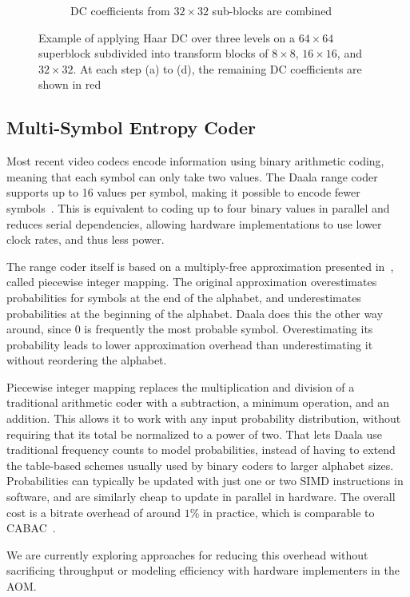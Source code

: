 \documentclass[english,conference,10pt]{IEEEtran}
\begin{document}
\begin{figure}
\begin{subfigure}[t]{0.49\columnwidth}
\caption{DC coefficients from $32\times 32$ sub-blocks are combined}
\end{subfigure}
\caption{Example of applying Haar DC over three levels on a $64\times 64$
superblock subdivided into transform blocks of $8 \times 8$, $16 \times 16$,
and $32 \times 32$. At each step (a) to (d), the remaining DC coefficients
are shown in red\label{fig:haardc}}

\end{figure}

\subsection{Multi-Symbol Entropy Coder}
\label{sec:EntropyCoder}

Most recent video codecs encode information using binary arithmetic
coding, meaning that each symbol can only take two values. The Daala
range coder supports up to 16 values per symbol, making it possible
to encode fewer symbols~\cite{derfTools}. This is equivalent to
coding up to four binary values in parallel and reduces serial dependencies,
allowing hardware implementations to use lower clock rates, and thus less
power.

The range coder itself is based on a multiply-free approximation presented
in~\cite{stuiver1998piecewise}, called piecewise integer mapping. The original
approximation overestimates probabilities for symbols at the end of the alphabet, and underestimates
probabilities at the beginning of the alphabet. Daala does this the
other way around, since $0$ is frequently the most probable symbol.
Overestimating its probability leads to lower approximation overhead than
underestimating it without reordering the alphabet.

Piecewise integer mapping replaces the multiplication and division of a traditional
arithmetic coder with a subtraction, a minimum operation, and an addition. This
allows it to work with any input probability distribution, without requiring
that its total be normalized to a power of two. That lets Daala use traditional
frequency counts to model probabilities, instead of having to extend the
table-based schemes usually used by binary coders to larger alphabet sizes.
Probabilities can typically be updated with just one or two SIMD instructions
in software, and are similarly cheap to update in parallel in hardware. The
overall cost is a bitrate overhead of around $1\%$ in practice,
which is comparable to CABAC~\cite{MSW03}.

We are currently exploring approaches for reducing this overhead without
sacrificing throughput or modeling efficiency with hardware implementers in the
AOM\@.
\end{document}

